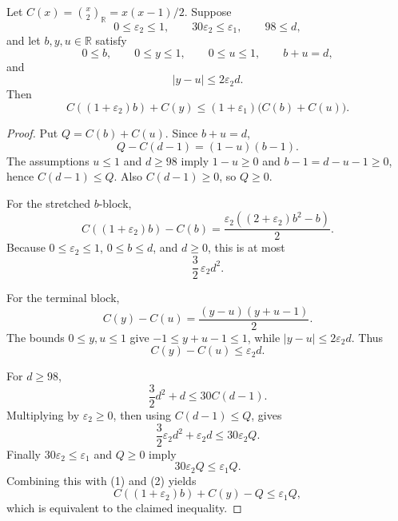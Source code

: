 \begin{helper}
Let \(C(x)=\binom{x}{2}_{\mathbb R}=x(x-1)/2\).  Suppose
\[
0\le \varepsilon_2\le1,\qquad 30\varepsilon_2\le\varepsilon_1,\qquad
98\le d,
\]
and let \(b,y,u\in\mathbb R\) satisfy
\[
0\le b,\qquad 0\le y\le1,\qquad 0\le u\le1,\qquad b+u=d,
\]
and
\[
|y-u|\le 2\varepsilon_2 d.
\]
Then
\[
C((1+\varepsilon_2)b)+C(y)
\le
(1+\varepsilon_1)\bigl(C(b)+C(u)\bigr).
\]
\end{helper}
\begin{proof}
Put \(Q=C(b)+C(u)\).  Since \(b+u=d\),
\[
Q-C(d-1)=(1-u)(b-1).
\]
The assumptions \(u\le1\) and \(d\ge98\) imply \(1-u\ge0\) and
\(b-1=d-u-1\ge0\), hence \(C(d-1)\le Q\).  Also \(C(d-1)\ge0\), so
\(Q\ge0\).

For the stretched \(b\)-block,
\[
C((1+\varepsilon_2)b)-C(b)
=\frac{\varepsilon_2((2+\varepsilon_2)b^2-b)}2.
\]
Because \(0\le\varepsilon_2\le1\), \(0\le b\le d\), and \(d\ge0\), this is at most
\[
\frac32\,\varepsilon_2 d^2. \tag{1}
\]

For the terminal block,
\[
C(y)-C(u)=\frac{(y-u)(y+u-1)}2.
\]
The bounds \(0\le y,u\le1\) give \(-1\le y+u-1\le1\), while
\(|y-u|\le2\varepsilon_2d\).  Thus
\[
C(y)-C(u)\le\varepsilon_2d. \tag{2}
\]

For \(d\ge98\),
\[
\frac32d^2+d\le30C(d-1).
\]
Multiplying by \(\varepsilon_2\ge0\), then using \(C(d-1)\le Q\), gives
\[
\frac32\varepsilon_2d^2+\varepsilon_2d
\le30\varepsilon_2Q.
\]
Finally \(30\varepsilon_2\le\varepsilon_1\) and \(Q\ge0\) imply
\[
30\varepsilon_2Q\le\varepsilon_1Q.
\]
Combining this with (1) and (2) yields
\[
C((1+\varepsilon_2)b)+C(y)-Q\le\varepsilon_1Q,
\]
which is equivalent to the claimed inequality.
\end{proof}
